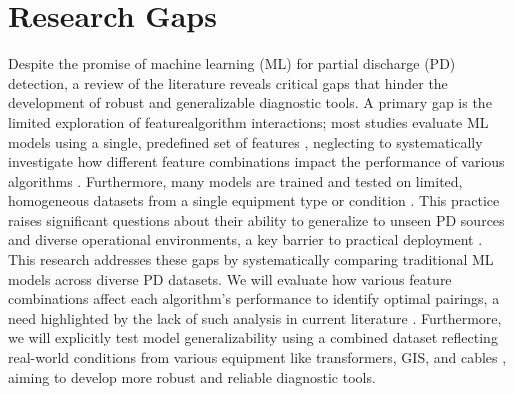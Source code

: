 \section{Research Gaps}

Despite the promise of machine learning (ML) for partial discharge (PD) detection, a review of the literature reveals critical gaps that hinder the development of robust and generalizable diagnostic tools. A primary gap is the limited exploration of featurealgorithm interactions; most studies evaluate ML models using a single, predefined set of features \parencite{Lu_2020_2}, neglecting to systematically investigate how different feature combinations impact the performance of various algorithms \parencite{Nimmo_2017_1, Govindarajan_2021_2}. Furthermore, many models are trained and tested on limited, homogeneous datasets from a single equipment type or condition \parencite{Woon_2016_1, Kim_2021}. This practice raises significant questions about their ability to generalize to unseen PD sources and diverse operational environments, a key barrier to practical deployment \parencite{Lu_2020_2}. This research addresses these gaps by systematically comparing traditional ML models across diverse PD datasets. We will evaluate how various feature combinations affect each algorithm's performance to identify optimal pairings, a need highlighted by the lack of such analysis in current literature \parencite{Govindarajan_2021_2}. Furthermore, we will explicitly test model generalizability using a combined dataset reflecting real-world conditions from various equipment like transformers, GIS, and cables \parencite{Bin_2020_1, Meitei_2020}, aiming to develop more robust and reliable diagnostic tools.

